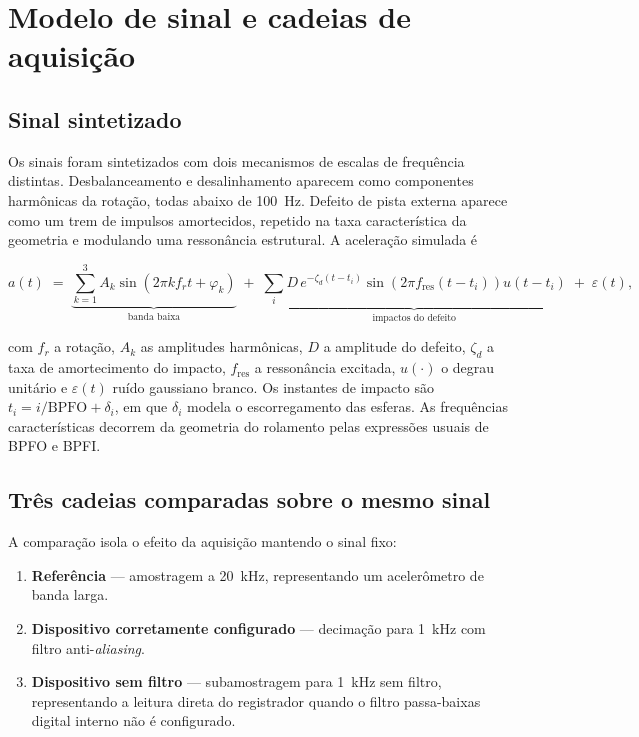\section{Modelo de sinal e cadeias de aquisição}
\label{sec:dev-sinal}

\subsection{Sinal sintetizado}

Os sinais foram sintetizados com dois mecanismos de escalas de frequência distintas.
Desbalanceamento e desalinhamento aparecem como componentes harmônicas da rotação, todas
abaixo de \SI{100}{\hertz}. Defeito de pista externa aparece como um trem de impulsos
amortecidos, repetido na taxa característica da geometria e modulando uma ressonância
estrutural. A aceleração simulada é

\begin{equation}
a(t) \;=\; \underbrace{\sum_{k=1}^{3} A_k \sin\!\left(2\pi k f_r t + \varphi_k\right)}_{\text{banda baixa}}
\;+\; \underbrace{\sum_{i} D\, e^{-\zeta_d (t-t_i)} \sin\!\left(2\pi f_{\mathrm{res}} (t-t_i)\right) u(t-t_i)}_{\text{impactos do defeito}}
\;+\; \varepsilon(t),
\label{eq:dev-sinal}
\end{equation}

\noindent
com $f_r$ a rotação, $A_k$ as amplitudes harmônicas, $D$ a amplitude do defeito, $\zeta_d$
a taxa de amortecimento do impacto, $f_{\mathrm{res}}$ a ressonância excitada,
$u(\cdot)$ o degrau unitário e $\varepsilon(t)$ ruído gaussiano branco. Os instantes de
impacto são $t_i = i/\mathrm{BPFO} + \delta_i$, em que $\delta_i$ modela o escorregamento
das esferas. As frequências características decorrem da geometria do rolamento pelas
expressões usuais de BPFO e BPFI.

\subsection{Três cadeias comparadas sobre o mesmo sinal}

A comparação isola o efeito da aquisição mantendo o sinal fixo:

\begin{enumerate}
  \item \textbf{Referência} --- amostragem a \SI{20}{\kilo\hertz}, representando um
        acelerômetro de banda larga.
  \item \textbf{Dispositivo corretamente configurado} --- decimação para
        \SI{1}{\kilo\hertz} com filtro anti-\emph{aliasing}.
  \item \textbf{Dispositivo sem filtro} --- subamostragem para \SI{1}{\kilo\hertz} sem
        filtro, representando a leitura direta do registrador quando o filtro passa-baixas
        digital interno não é configurado.
\end{enumerate}

